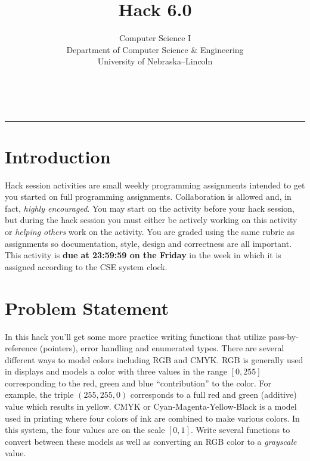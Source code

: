 \documentclass[12pt]{scrartcl}
\title{Hack 6.0}\let\Title\@title
\subtitle{Computer Science I\\
{\small
\vskip1cm
Department of Computer Science \& Engineering \\
University of Nebraska--Lincoln}
\vskip-1cm}
\date{~}
\begin{document}
\maketitle

\hrule

\section*{Introduction}

Hack session activities are small weekly programming assignments intended
to get you started on full programming assignments.  Collaboration is allowed
and, in fact, \emph{highly encouraged}.  You may start on the activity before
your hack session, but during the hack session you must either be actively 
working on this activity or \emph{helping others} work on the activity.
You are graded using the same rubric as assignments so documentation, style, 
design and correctness are all important.  This activity is \textbf{due 
at 23:59:59 on the Friday} in the week in which it is assigned according 
to the CSE system clock.


\section*{Problem Statement}

In this hack you'll get some more practice writing functions that utilize 
pass-by-reference (pointers), error handling and enumerated types.  There 
are several different
ways to model colors including RGB and CMYK.  RGB is generally used in displays
and models a color with three values in the range $[0, 255]$ corresponding to 
the red, green and blue ``contribution'' to the color.  For example, the
triple $(255, 255, 0)$ corresponds to a full red and green (additive) value
which results in yellow.  CMYK or Cyan-Magenta-Yellow-Black is a model used
in printing where four colors of ink are combined to make various colors.
In this system, the four values are on the scale $[0, 1]$.  Write several
functions to convert between these models as well as converting an RGB
color to a \emph{grayscale} value.
\end{document}
